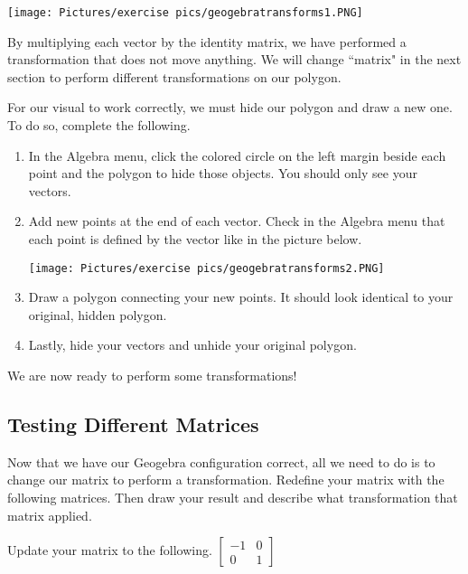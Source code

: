 \begin{center}
\texttt{[image: Pictures/exercise pics/geogebratransforms1.PNG]}    
\end{center}

\noindent By multiplying each vector by the identity matrix, we have performed a transformation that does not move anything. We will change ``matrix" in the next section to perform different transformations on our polygon.\\

\begin{exercise}
For our visual to work correctly, we must hide our polygon and draw a new one. To do so, complete the following.
\end{exercise}

\begin{enumerate}
    \item In the Algebra menu, click the colored circle on the left margin beside each point and the polygon to hide those objects. You should only see your vectors.
    \item Add new points at the end of each vector. Check in the Algebra menu that each point is defined by the vector like in the picture below.
    \begin{center}
    \texttt{[image: Pictures/exercise pics/geogebratransforms2.PNG]}    
    \end{center}
    \item Draw a polygon connecting your new points. It should look identical to your original, hidden polygon.
    \item Lastly, hide your vectors and unhide your original polygon. 
\end{enumerate}

\noindent We are now ready to perform some transformations!

 
\subsection{Testing Different Matrices}

\noindent Now that we have our Geogebra configuration correct, all we need to do is to change our matrix to perform a transformation. Redefine your matrix with the following matrices. Then draw your result and describe what transformation that matrix applied.

\begin{exercise} 
Update your matrix to the following.
$\left[\begin{array}{cc}
-1 & 0\\
0 & 1
\end{array}\right]$
\end{exercise}

